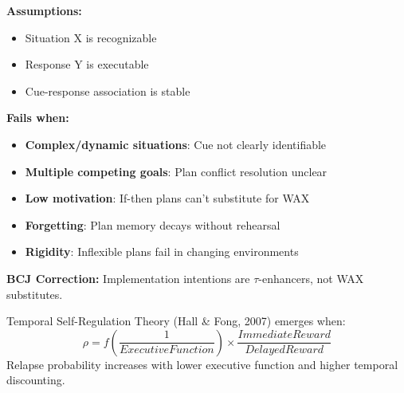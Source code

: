 \begin{tcolorbox}[colback=red!5!white, colframe=red!75!black, title=Boundary Condition: Where Implementation Intentions Fail]
\textbf{Assumptions:}
\begin{itemize}[nosep]
\item Situation X is recognizable
\item Response Y is executable
\item Cue-response association is stable
\end{itemize}

\textbf{Fails when:}
\begin{itemize}[nosep]
\item \textbf{Complex/dynamic situations}: Cue not clearly identifiable
\item \textbf{Multiple competing goals}: Plan conflict resolution unclear
\item \textbf{Low motivation}: If-then plans can't substitute for WAX
\item \textbf{Forgetting}: Plan memory decays without rehearsal
\item \textbf{Rigidity}: Inflexible plans fail in changing environments
\end{itemize}

\textbf{BCJ Correction:} Implementation intentions are $\tau$-enhancers, not WAX substitutes.
\end{tcolorbox}


\begin{theorem}
\label{thm:temporal-self-regulation}
Temporal Self-Regulation Theory (Hall \& Fong, 2007) emerges when:
\begin{equation}
\boxed{\rho = f\left(\frac{1}{Executive Function}\right) \times \frac{Immediate Reward}{Delayed Reward}}
\end{equation}
Relapse probability increases with lower executive function and higher temporal discounting.
\end{theorem}


